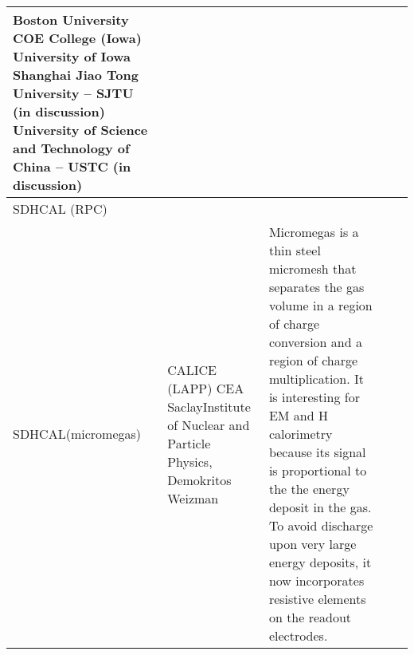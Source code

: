 \begin{landscape}
\begin{adjustbox}{max width=1\textheight,totalheight=1\textwidth}
\begin{tabularx}{2\textheight}{lXXXX}
    Boston University                  \newline
    COE College (Iowa)                         \newline
    University of Iowa                                 \newline
    Shanghai Jiao Tong University -- SJTU (in discussion)      \newline
    University of Science and Technology of China -- USTC (in discussion) &
     &
     &                                                                                                                                                                                                                                   \\
     \midrule
    SDHCAL (RPC)                                                                                                   &                                                                                                                                         &                                                                                                                                                                                                                                                                                                                                                                                      &                                                                                                                                                                                                                                                                 &                                                                                                                                                                                                                                     \\
    \midrule
    SDHCAL(micromegas) &
     CALICE (LAPP) \newline CEA Saclay\newline Institute of Nuclear and Particle Physics, Demokritos  \newline Weizman &
      Micromegas is a thin steel micromesh that separates the gas volume in a region of charge conversion and a region of charge multiplication. It is interesting for EM and H calorimetry because its signal is proportional to the the energy deposit in the gas. To avoid discharge upon very large energy deposits, it now incorporates resistive elements on the readout electrodes. &
      \begin{itemize}

\end{itemize}
\end{tabularx}
\end{adjustbox}
\end{landscape}
